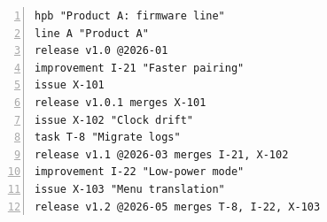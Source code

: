 \begin{figure}[tbp]
\centering
\begin{minipage}{0.66\linewidth}
\begin{lstlisting}[style=hpb,basicstyle=\ttfamily\footnotesize,numbers=left,numberstyle=\tiny\color{black!45},numbersep=6pt,xleftmargin=16pt]
hpb "Product A: firmware line"
line A "Product A"
release v1.0 @2026-01
improvement I-21 "Faster pairing"
issue X-101
release v1.0.1 merges X-101
issue X-102 "Clock drift"
task T-8 "Migrate logs"
release v1.1 @2026-03 merges I-21, X-102
improvement I-22 "Low-power mode"
issue X-103 "Menu translation"
release v1.2 @2026-05 merges T-8, I-22, X-103
\end{lstlisting}
\end{minipage}


\end{figure}
